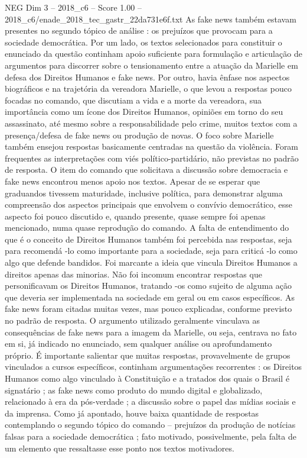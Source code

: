 \begin{textsample}{NEG Dim 3 – 2018\_c6 – Score 1.00 – 2018\_c6/enade\_2018\_tec\_gastr\_22da731e6f.txt}
As fake news também estavam presentes no segundo tópico de análise : os prejuízos que provocam para a sociedade democrática.
Por um lado, os textos selecionados para constituir o enunciado da questão continham apoio suficiente para formulação e articulação de argumentos para discorrer sobre o tensionamento entre a atuação da Marielle em defesa dos Direitos Humanos e fake news.
Por outro, havia ênfase nos aspectos biográficos e na trajetória da vereadora Marielle, o que levou a respostas pouco focadas no comando, que discutiam a vida e a morte da vereadora, sua importância como um ícone dos Direitos Humanos, opiniões em torno do seu assassinato, até mesmo sobre a responsabilidade pelo crime, muitos textos com a presença/defesa de fake news ou produção de novas.
O foco sobre Marielle também ensejou respostas basicamente centradas na questão da violência.
Foram frequentes as interpretações com viés político-partidário, não previstas no padrão de resposta.
O item do comando que solicitava a discussão sobre democracia e fake news encontrou menos apoio nos textos.
Apesar de se esperar que graduandos tivessem maturidade, inclusive política, para demonstrar alguma compreensão dos aspectos principais que envolvem o convívio democrático, esse aspecto foi pouco discutido e, quando presente, quase sempre foi apenas mencionado, numa quase reprodução do comando.
A falta de entendimento do que é o conceito de Direitos Humanos também foi percebida nas respostas, seja para recomendá -lo como importante para a sociedade, seja para criticá -lo como algo que defende bandidos.
Foi marcante a ideia que vincula Direitos Humanos a direitos apenas das minorias.
Não foi incomum encontrar respostas que personificavam os Direitos Humanos, tratando -os como sujeito de alguma ação que deveria ser implementada na sociedade em geral ou em casos específicos.
As fake news foram citadas muitas vezes, mas pouco explicadas, conforme previsto no padrão de resposta.
O argumento utilizado geralmente vinculava as consequências de fake news para a imagem da Marielle, ou seja, centrava no fato em si, já indicado no enunciado, sem qualquer análise ou aprofundamento próprio.
É importante salientar que muitas respostas, provavelmente de grupos vinculados a cursos específicos, continham argumentações recorrentes : os Direitos Humanos como algo vinculado à Constituição e a tratados dos quais o Brasil é signatário ; as fake news como produto do mundo digital e globalizado, relacionado à era da pós-verdade ; a discussão sobre o papel das mídias sociais e da imprensa.
Como já apontado, houve baixa quantidade de respostas contemplando o segundo tópico do comando – prejuízos da produção de notícias falsas para a sociedade democrática ; fato motivado, possivelmente, pela falta de um elemento que ressaltasse esse ponto nos textos motivadores.

\end{textsample}
